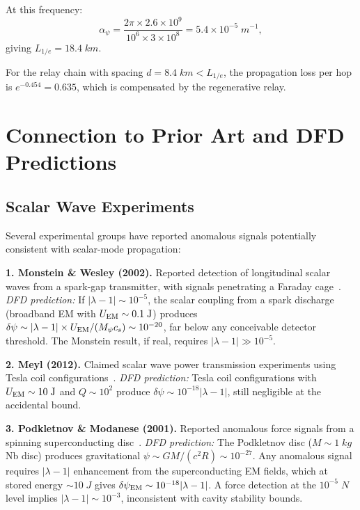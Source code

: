 \documentclass[twocolumn,superscriptaddress,prd]{revtex4-2}
\begin{document}
At this frequency:
\begin{equation}
\alpha_\psi = \frac{2\pi \times 2.6\times10^9}{10^6 \times 3\times10^8} = 5.4\times10^{-5}\;\si{m^{-1}},
\end{equation}
giving $L_{1/e} = 18.4\;\si{km}$.

For the relay chain with spacing $d = 8.4\;\si{km} < L_{1/e}$,
the propagation loss per hop is $e^{-0.454} = 0.635$, which is
compensated by the regenerative relay.

\section{Connection to Prior Art and DFD Predictions}
\label{sec:literature}

\subsection{Scalar Wave Experiments}

Several experimental groups have reported anomalous signals
potentially consistent with scalar-mode propagation:

\textbf{1. Monstein \& Wesley (2002).} Reported detection of
longitudinal scalar waves from a spark-gap transmitter, with
signals penetrating a Faraday cage~\cite{Monstein2002}.
\textit{DFD prediction:} If $|\lambda-1| \sim 10^{-5}$,
the scalar coupling from a spark discharge (broadband EM
with $U_{\rm EM} \sim 0.1\;\si{J}$) produces
$\delta\psi \sim |\lambda-1|\times U_{\rm EM}/(M_\psi c_s)
\sim 10^{-20}$, far below any conceivable detector threshold.
The Monstein result, if real, requires $|\lambda-1| \gg 10^{-5}$.

\textbf{2. Meyl (2012).} Claimed scalar wave power transmission
experiments using Tesla coil configurations~\cite{Meyl2003}.
\textit{DFD prediction:} Tesla coil configurations with
$U_{\rm EM} \sim 10\;\si{J}$ and $Q \sim 10^2$ produce
$\delta\psi \sim 10^{-18}|\lambda-1|$, still negligible
at the accidental bound.

\textbf{3. Podkletnov \& Modanese (2001).} Reported anomalous
force signals from a spinning superconducting disc~\cite{Podkletnov2001}.
\textit{DFD prediction:} The Podkletnov disc ($M \sim 1\;\si{kg}$
Nb disc) produces gravitational $\psi \sim GM/(c^2 R)
\sim 10^{-27}$. Any anomalous signal requires $|\lambda-1|$
enhancement from the superconducting EM fields, which at
stored energy $\sim 10\;\si{J}$ gives $\delta\psi_{\rm EM}
\sim 10^{-18}|\lambda-1|$. A force detection at the
$10^{-5}\;\si{N}$ level implies $|\lambda-1| \sim 10^{-3}$,
inconsistent with cavity stability bounds.
\end{document}
